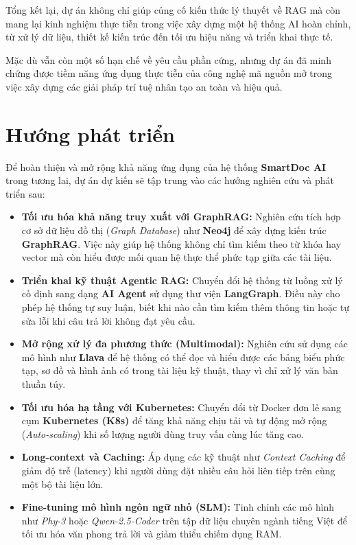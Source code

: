 ﻿\documentclass[10pt, conference, a4paper, compsocconf]{IEEEtran}
\begin{document}
Tổng kết lại, dự án không chỉ giúp củng cố kiến thức lý thuyết về RAG mà còn mang lại kinh nghiệm thực tiễn trong việc xây dựng một hệ thống AI hoàn chỉnh, từ xử lý dữ liệu, thiết kế kiến trúc đến tối ưu hiệu năng và triển khai thực tế.

Mặc dù vẫn còn một số hạn chế về yêu cầu phần cứng, nhưng dự án đã minh chứng được tiềm năng ứng dụng thực tiễn của công nghệ mã nguồn mở trong việc xây dựng các giải pháp trí tuệ nhân tạo an toàn và hiệu quả.

\section{Hướng phát triển}

Để hoàn thiện và mở rộng khả năng ứng dụng của hệ thống \textbf{SmartDoc AI} trong tương lai, dự án dự kiến sẽ tập trung vào các hướng nghiên cứu và phát triển sau:

\begin{itemize}
    \item \textbf{Tối ưu hóa khả năng truy xuất với GraphRAG:} Nghiên cứu tích hợp cơ sở dữ liệu đồ thị (\textit{Graph Database}) như \textbf{Neo4j} để xây dựng kiến trúc \textbf{GraphRAG}. Việc này giúp hệ thống không chỉ tìm kiếm theo từ khóa hay vector mà còn hiểu được mối quan hệ thực thể phức tạp giữa các tài liệu.
    \item \textbf{Triển khai kỹ thuật Agentic RAG:} Chuyển đổi hệ thống từ luồng xử lý cố định sang dạng \textbf{AI Agent} sử dụng thư viện \textbf{LangGraph}. Điều này cho phép hệ thống tự suy luận, biết khi nào cần tìm kiếm thêm thông tin hoặc tự sửa lỗi khi câu trả lời không đạt yêu cầu.
    \item \textbf{Mở rộng xử lý đa phương thức (Multimodal):} Nghiên cứu sử dụng các mô hình như \textbf{Llava} để hệ thống có thể đọc và hiểu được các bảng biểu phức tạp, sơ đồ và hình ảnh có trong tài liệu kỹ thuật, thay vì chỉ xử lý văn bản thuần túy.
    \item \textbf{Tối ưu hóa hạ tầng với Kubernetes:} Chuyển đổi từ Docker đơn lẻ sang cụm \textbf{Kubernetes (K8s)} để tăng khả năng chịu tải và tự động mở rộng (\textit{Auto-scaling}) khi số lượng người dùng truy vấn cùng lúc tăng cao.
     \item \textbf{Long-context và Caching:} Áp dụng các kỹ thuật như \textit{Context Caching} để giảm độ trễ (latency) khi người dùng đặt nhiều câu hỏi liên tiếp trên cùng một bộ tài liệu lớn.
    \item \textbf{Fine-tuning mô hình ngôn ngữ nhỏ (SLM):} Tinh chỉnh các mô hình như \textit{Phy-3} hoặc \textit{Qwen-2.5-Coder} trên tập dữ liệu chuyên ngành tiếng Việt để tối ưu hóa văn phong trả lời và giảm thiểu chiếm dụng RAM.
\end{itemize}
\end{document}
